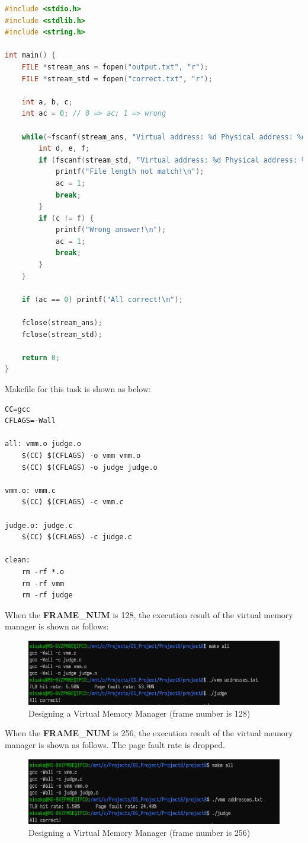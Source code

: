\documentclass[UTF8,10pt,a4paper]{article}
\theoremstyle{Problem}
\theoremstyle{Solution}
\begin{document}
\begin{lstlisting}[language = c]
#include <stdio.h>
#include <stdlib.h>
#include <string.h>

int main() {
	FILE *stream_ans = fopen("output.txt", "r");
	FILE *stream_std = fopen("correct.txt", "r");
    
    int a, b, c;
    int ac = 0; // 0 => ac; 1 => wrong

    while(~fscanf(stream_ans, "Virtual address: %d Physical address: %d Value: %d\n", &a, &b, &c)) {
        int d, e, f;
        if (fscanf(stream_std, "Virtual address: %d Physical address: %d Value: %d\n", &d, &e, &f) == EOF) {
            printf("File length not match!\n");
			ac = 1;
			break;
        }
        if (c != f) {
            printf("Wrong answer!\n");
			ac = 1;
			break;
        }
    }
    
    if (ac == 0) printf("All correct!\n");

    fclose(stream_ans);
    fclose(stream_std);

    return 0;
}
\end{lstlisting}


Makefile for this task is shown as below:
\begin{lstlisting}
CC=gcc
CFLAGS=-Wall

all: vmm.o judge.o
	$(CC) $(CFLAGS) -o vmm vmm.o
	$(CC) $(CFLAGS) -o judge judge.o

vmm.o: vmm.c
	$(CC) $(CFLAGS) -c vmm.c

judge.o: judge.c
	$(CC) $(CFLAGS) -c judge.c

clean:
	rm -rf *.o
	rm -rf vmm
	rm -rf judge
\end{lstlisting}


When the \textbf{FRAME\_NUM} is 128, the execution result of the virtual memory manager is shown as follows:
\begin{figure}[H]
    \centering
    \includegraphics[width=400pt]{1.png}
    \caption{Designing a Virtual Memory Manager (frame number is 128)}
    \label{3}
\end{figure}

When the \textbf{FRAME\_NUM} is 256, the execution result of the virtual memory manager is shown as follows. The page fault rate is dropped.
\begin{figure}[H]
    \centering
    \includegraphics[width=400pt]{2.png}
    \caption{Designing a Virtual Memory Manager (frame number is 256)}
    \label{3}
\end{figure}
\end{document}
